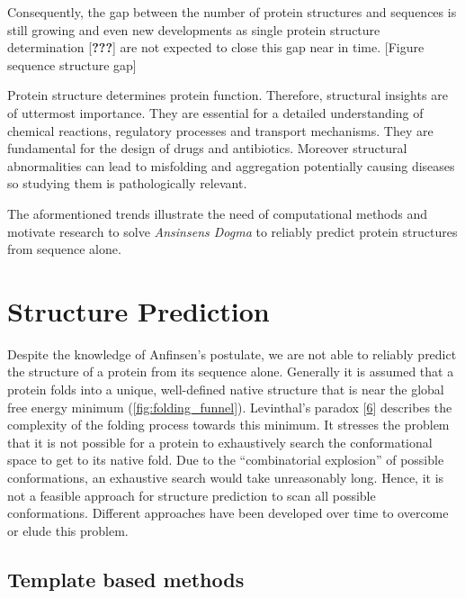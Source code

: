 \documentclass[12pt,a4paper,twoside]{book}
\theoremstyle{definition}
\theoremstyle{definition}
\theoremstyle{remark}
\begin{document}
Consequently, the gap between the number of protein structures and
sequences is still growing and even new developments as single protein
structure determination {[}{\textbf{???}}{]} are not expected to close
this gap near in time. {[}Figure sequence structure gap{]}

Protein structure determines protein function. Therefore, structural
insights are of uttermost importance. They are essential for a detailed
understanding of chemical reactions, regulatory processes and transport
mechanisms. They are fundamental for the design of drugs and
antibiotics. Moreover structural abnormalities can lead to misfolding
and aggregation potentially causing diseases so studying them is
pathologically relevant.

The aformentioned trends illustrate the need of computational methods
and motivate research to solve \emph{Ansinsens Dogma} to reliably
predict protein structures from sequence alone.

\section{Structure Prediction}\label{structure-prediction}

Despite the knowledge of Anfinsen's postulate, we are not able to
reliably predict the structure of a protein from its sequence alone.
Generally it is assumed that a protein folds into a unique, well-defined
native structure that is near the global free energy minimum
(\autoref{fig:folding_funnel}). Levinthal's paradox
{[}\protect\hyperlink{ref-Levinthal1969}{6}{]} describes the complexity
of the folding process towards this minimum. It stresses the problem
that it is not possible for a protein to exhaustively search the
conformational space to get to its native fold. Due to the
``combinatorial explosion'' of possible conformations, an exhaustive
search would take unreasonably long. Hence, it is not a feasible
approach for structure prediction to scan all possible conformations.
Different approaches have been developed over time to overcome or elude
this problem.

\subsection{Template based methods}\label{template-based-methods}
\end{document}

